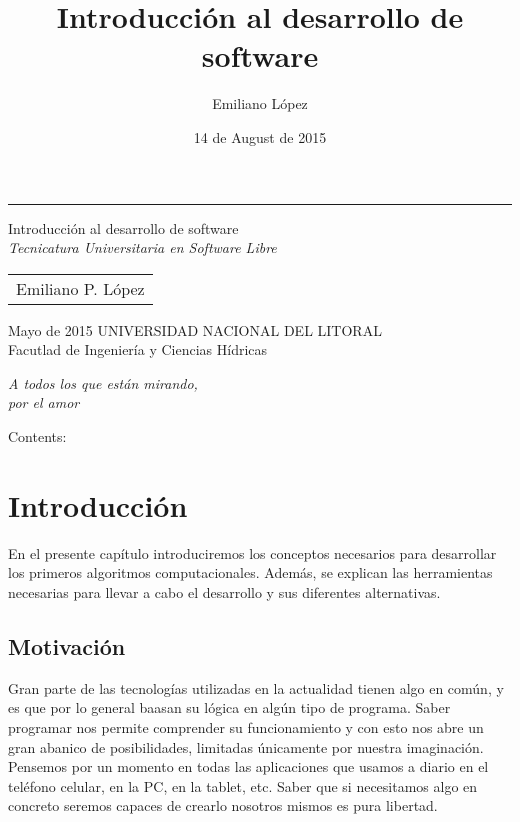 \documentclass[a4paper,12pt,spanish]{sphinxmanual}
\title{Introducción al desarrollo de software}
\date{14 de August de 2015}
\author{Emiliano López}
\newcommand{\sphinxlogo}{}
\begin{document}

\begin{titlepage}%
    \let\footnotesize\small
    \let\footnoterule\relax
    \rule{\textwidth}{1pt}%
    \begin{flushright}%
      \sphinxlogo%
      \vspace{15 mm}
      {\rm\Huge Introducción al desarrollo de software\\ }
      {\em\large Tecnicatura Universitaria en Software Libre}
      \vfill
      {
        \begin{tabular}[t]{c}
          \large Emiliano P. López
        \end{tabular}
        \par}
      \vfill\vfill
      {\large
        Mayo de 2015
       \vfill
       UNIVERSIDAD NACIONAL DEL LITORAL\\
          Facutlad de Ingeniería y Ciencias Hídricas\\
      }%
    \end{flushright}%
  \end{titlepage}%
  \cleardoublepage%
  \label{pre:dedication}
  \vspace*{\fill}
  \begin{flushright}
    \emph{A todos los que están mirando,\\por el amor}
  \end{flushright}
  \vspace{\fill}

\tableofcontents
{}\label{index::doc}


Contents:


\chapter{Introducción}
\label{Unidad01:introduccion}\label{Unidad01::doc}\label{Unidad01:introduccion-al-desarrollo-de-software}
En el presente capítulo introduciremos los conceptos necesarios para
desarrollar los primeros algoritmos computacionales. Además, se explican
las herramientas necesarias para llevar a cabo el desarrollo y sus
diferentes alternativas.


\section{Motivación}
\label{Unidad01:motivacion}
Gran parte de las tecnologías utilizadas en la actualidad tienen algo en
común, y es que por lo general baasan su lógica en algún tipo de
programa. Saber programar nos permite comprender su funcionamiento y con
esto nos abre un gran abanico de posibilidades, limitadas únicamente por
nuestra imaginación. Pensemos por un momento en todas las aplicaciones
que usamos a diario en el teléfono celular, en la PC, en la tablet, etc.
Saber que si necesitamos algo en concreto seremos capaces de crearlo
nosotros mismos es pura libertad.
\end{document}
